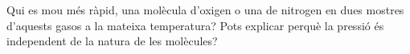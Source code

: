 \begin{exr}
Qui es mou més ràpid, una molècula d'oxigen o una de nitrogen en dues mostres d'aquests gasos a la mateixa temperatura? Pots explicar perquè la pressió és independent de la natura de les molècules?
\end{exr}